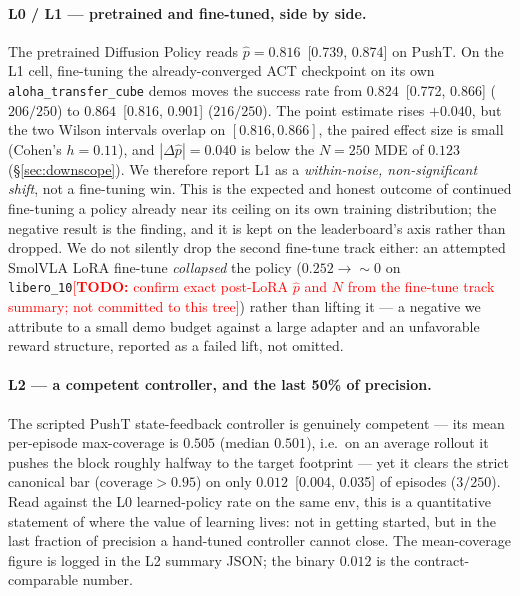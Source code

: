 \documentclass[10pt]{article}
\newcommand{\todo}[1]{\textcolor{red}{[\textbf{TODO:} #1]}}
\begin{document}
\paragraph{L0 / L1 --- pretrained and fine-tuned, side by side.}
The pretrained Diffusion Policy reads $\hat{p}{=}0.816$~[0.739, 0.874] on
PushT. On the L1 cell, fine-tuning the already-converged ACT checkpoint on
its own \texttt{aloha\_transfer\_cube} demos moves the success rate from
$0.824$~[0.772, 0.866] ($206/250$) to $0.864$~[0.816, 0.901] ($216/250$).
The point estimate rises $+0.040$, but the two Wilson intervals overlap
on $[0.816, 0.866]$, the paired effect size is small (Cohen's
$h{=}0.11$), and $|\Delta\hat{p}|{=}0.040$ is below the $N{=}250$ MDE of
$0.123$ (\S\ref{sec:downscope}). We therefore report L1 as a
\emph{within-noise, non-significant shift}, not a fine-tuning win. This
is the expected and honest outcome of continued fine-tuning a policy
already near its ceiling on its own training distribution; the negative
result is the finding, and it is kept on the leaderboard's axis rather
than dropped. We do not silently drop the second fine-tune track either:
an attempted SmolVLA LoRA fine-tune \emph{collapsed} the policy
($0.252\to{\sim}0$ on \texttt{libero\_10}\todo{confirm exact post-LoRA
$\hat{p}$ and $N$ from the fine-tune track summary; not committed to this
tree}) rather than lifting it --- a negative we attribute to a small demo
budget against a large adapter and an unfavorable reward structure,
reported as a failed lift, not omitted.

\paragraph{L2 --- a competent controller, and the last 50\% of precision.}
The scripted PushT state-feedback controller is genuinely competent ---
its mean per-episode max-coverage is $0.505$ (median $0.501$),
i.e.\ on an average rollout it pushes the block roughly
halfway to the target footprint --- yet it
clears the strict canonical bar ($\text{coverage}>0.95$) on only
$0.012$~[0.004, 0.035] of episodes ($3/250$). Read against the L0
learned-policy rate on the same env, this is a quantitative statement of
where the value of learning lives: not in getting started, but in the
last fraction of precision a hand-tuned controller cannot close. The
mean-coverage figure is logged in the L2 summary JSON; the binary
$0.012$ is the contract-comparable number.
\end{document}
